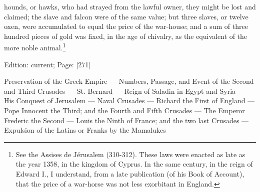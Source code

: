 hounds, or hawks, who had strayed from the lawful owner, they might be lost and claimed; the slave and falcon were of the same value; but three slaves, or twelve oxen, were accumulated to equal the price of the war-house; and a sum of three hundred pieces of gold was fixed, in the age of chivalry, as the equivalent of the more noble animal.\footnote{See the Assises de Jérusalem (310-312). These laws were enacted as late as the year 1358, in the kingdom of Cyprus. In the same century, in the reign of Edward I., I understand, from a late publication (of his Book of Account), that the price of a war-horse was not less exorbitant in England.}

Edition: current; Page: [271]


Preservation of the Greek Empire \texthebrew{—} Numbers, Passage, and Event of the Second and Third Crusades \texthebrew{—} St. Bernard \texthebrew{—} Reign of Saladin in Egypt and Syria \texthebrew{—} His Conquest of Jerusalem \texthebrew{—} Naval Crusades \texthebrew{—} Richard the First of England \texthebrew{—} Pope Innocent the Third; and the Fourth and Fifth Crusades \texthebrew{—} The Emperor Frederic the Second \texthebrew{—} Louis the Ninth of France; and the two last Crusades \texthebrew{—} Expulsion of the Latins or Franks by the Mamalukes

